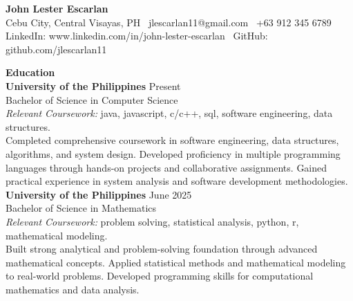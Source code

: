 \documentclass[11pt,letterpaper]{article}
\newcommand{\ressection}[1]{\vspace{0.3cm}\textbf{\large #1}\\[0.1cm]}
\begin{document}
\begin{center}
    \textbf{\Large John Lester Escarlan}\\[0.2cm]
    Cebu City, Central Visayas, PH \textbullet\ jlescarlan11@gmail.com \textbullet\ +63 912 345 6789\\
    LinkedIn: www.linkedin.com/in/john-lester-escarlan \textbullet\ GitHub: github.com/jlescarlan11
\end{center}

\vspace{0.3cm}

\ressection{Education}
\textbf{University of the Philippines} \hfill Present\\
Bachelor of Science in Computer Science\\
\textit{Relevant Coursework:} java, javascript, c/c++, sql, software engineering, data structures.\\
Completed comprehensive coursework in software engineering, data structures, algorithms, and system design. Developed proficiency in multiple programming languages through hands-on projects and collaborative assignments. Gained practical experience in system analysis and software development methodologies.\\[0.3cm]\textbf{University of the Philippines} \hfill June 2025\\
Bachelor of Science in Mathematics\\
\textit{Relevant Coursework:} problem solving, statistical analysis, python, r, mathematical modeling.\\
Built strong analytical and problem-solving foundation through advanced mathematical concepts. Applied statistical methods and mathematical modeling to real-world problems. Developed programming skills for computational mathematics and data analysis.\\[0.3cm]
\end{document}
